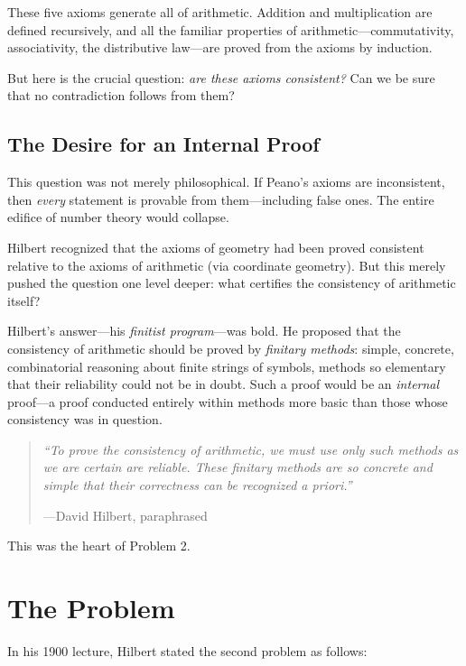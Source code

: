 These five axioms generate all of arithmetic. Addition and multiplication are defined recursively, and all the familiar properties of arithmetic---commutativity, associativity, the distributive law---are proved from the axioms by induction.

But here is the crucial question: \emph{are these axioms consistent?} Can we be sure that no contradiction follows from them?

\subsection{The Desire for an Internal Proof}

This question was not merely philosophical. If Peano's axioms are inconsistent, then \emph{every} statement is provable from them---including false ones. The entire edifice of number theory would collapse.

Hilbert recognized that the axioms of geometry had been proved consistent relative to the axioms of arithmetic (via coordinate geometry). But this merely pushed the question one level deeper: what certifies the consistency of arithmetic itself?

Hilbert's answer---his \emph{finitist program}---was bold. He proposed that the consistency of arithmetic should be proved by \emph{finitary methods}: simple, concrete, combinatorial reasoning about finite strings of symbols, methods so elementary that their reliability could not be in doubt. Such a proof would be an \emph{internal} proof---a proof conducted entirely within methods more basic than those whose consistency was in question.

\begin{quote}
\textit{``To prove the consistency of arithmetic, we must use only such methods as we are certain are reliable. These finitary methods are so concrete and simple that their correctness can be recognized a priori.''}\par\hfill ---David Hilbert, paraphrased
\end{quote}

This was the heart of Problem 2.

\section{The Problem}

In his 1900 lecture, Hilbert stated the second problem as follows:

